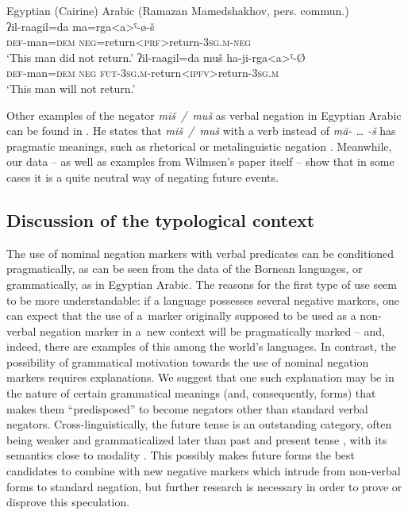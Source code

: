 \documentclass[output=paper]{langsci/langscibook}
\begin{document}
\ea Egyptian (Cairine) Arabic (Ramazan Mamedshakhov, pers. commun.) \label{ex:BK68}\\
  \ea
	\gll ʔil-raagil=da	ma=rga<a>ˤ-ø-š\\
	\textsc{def}-man=\textsc{dem}	\textsc{neg}=return<\textsc{prf}>return-\textsc{3sg.m-neg}\\
	\glt `This man did not return.'
  \ex
	\gll ʔil-raagil=da	muš	ha-ji-rga<a>ˤ-Ø\\
	\textsc{def}-man=\textsc{dem}	\textsc{neg}	\textsc{fut-3sg.m}-return<\textsc{ipfv}>return-\textsc{3sg.m}\\
	\glt `This man will not return.'
\z \z

Other examples of the negator \textit{miš / muš} as verbal negation in Egyptian Arabic can be found in \citet[93--94]{wilmsen-a}. He states that \textit{miš / muš} with a verb instead of \textit{mā- … -š} has pragmatic meanings, such as rhetorical or metalinguistic negation \citet[94]{wilmsen-a}. Meanwhile, our data – as well as examples from Wilmsen’s paper itself – show that in some cases it is a quite neutral way of negating future events.

\subsection{Discussion of the typological context}\label{sec:BK4.4}

The use of nominal negation markers with verbal predicates can be conditioned pragmatically, as can be seen from the data of the Bornean languages, or grammatically, as in Egyptian Arabic. The reasons for the first type of use seem to be more understandable: if a language possesses several negative markers, one can expect that the use of a marker originally supposed to be used as a non-verbal negation marker in a new context will be pragmatically marked – and, indeed, there are examples of this among the world’s languages. In contrast, the possibility of grammatical motivation towards the use of nominal negation markers requires explanations. We suggest that one such explanation may be in the nature of certain grammatical meanings (and, consequently, forms) that makes them “predisposed” to become negators other than standard verbal negators. Cross-linguistically, the future tense is an outstanding category, often being weaker and grammaticalized later than past and present tense \citep[771]{lindstedt2001a}, with its semantics close to modality \citep[280]{BybeePerkins1994}. This possibly makes future forms the best candidates to combine with new negative markers which intrude from non-verbal forms to standard negation, but further research is necessary in order to prove or disprove this speculation.
\end{document}
